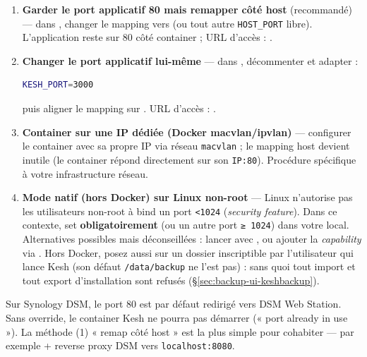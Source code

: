\documentclass[a4paper,11pt,oneside]{article}
\begin{document}
\begin{enumerate}
    \item \textbf{Garder le port applicatif 80 mais remapper côté host} (recommandé) — dans , changer le mapping  vers  (ou tout autre \texttt{HOST\_PORT} libre). L'application reste sur 80 côté container ; URL d'accès : .

    \item \textbf{Changer le port applicatif lui-même} — dans , décommenter et adapter :
    \begin{lstlisting}[language=bash]
KESH_PORT=3000
    \end{lstlisting}
    puis aligner le mapping  sur . URL d'accès : .

    \item \textbf{Container sur une IP dédiée (Docker macvlan/ipvlan)} — configurer le container avec sa propre IP via réseau \texttt{macvlan} ; le mapping host devient inutile (le container répond directement sur son \texttt{IP:80}). Procédure spécifique à votre infrastructure réseau.

    \item \textbf{Mode  natif (hors Docker) sur Linux non-root} — Linux n'autorise pas les utilisateurs non-root à bind un port \texttt{<1024} (\emph{security feature}). Dans ce contexte, set \textbf{obligatoirement}  (ou un autre port \texttt{≥ 1024}) dans votre  local. Alternatives possibles mais déconseillées : lancer avec , ou ajouter la \emph{capability} via . Hors Docker, posez aussi  sur un dossier inscriptible par l'utilisateur qui lance Kesh (son défaut \texttt{/data/backup} ne l'est pas) : sans quoi tout import et tout export d'installation sont refusés (\S\ref{sec:backup-ui-keshbackup}).
\end{enumerate}

\begin{keshtip}
Sur Synology DSM, le port 80 est par défaut redirigé vers DSM Web Station. Sans override, le container Kesh ne pourra pas démarrer (« port already in use »). La méthode (1) « remap côté host » est la plus simple pour cohabiter — par exemple  + reverse proxy DSM vers \texttt{localhost:8080}.
\end{keshtip}
\end{document}
